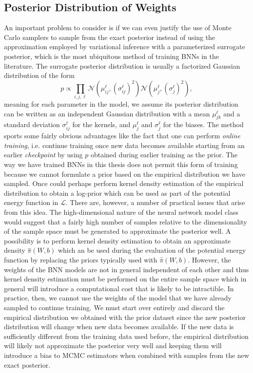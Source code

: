 \subsection{Posterior Distribution of Weights}
An important problem to consider is if we can even justify the use of Monte Carlo samplers to sample from the exact posterior instead of using the approximation employed by variational inference with a parameterized surrogate posterior, which is the most ubiquitous method of training BNNs in the literature. The surrogate posterior distribution is usually a factorized Gaussian distribution of the form
\begin{equation}\label{eq:surrogate_dist}
    p \propto \prod_{i, j, \ell} \mathcal{N}(\mu_{ij}^\ell, (\sigma_{ij}^\ell)^2) \mathcal{N}(\mu_{j}^\ell, (\sigma_{j}^\ell)^2),
\end{equation}
meaning for each parameter in the model, we assume its posterior distribution can be written as an independent Gaussian distribution with a mean $\mu_{jk}^\ell$ and a standard deviation $\sigma_{ij}^\ell$ for the kernels, and $\mu_j^\ell$ and $\sigma_j^\ell$ for the biases. The method sports some fairly obvious advantages like the fact that one can perform \textit{online training}, i.e. continue training once new data becomes available starting from an earlier \textit{checkpoint} by using $p$ obtained during earlier training as the prior. The way we have trained BNNs in this thesis does not permit this form of training because we cannot formulate a prior based on the empirical distribution we have sampled. Once could perhaps perform kernel density estimation of the empirical distribution to obtain a log-prior which can be used as part of the potential energy function in $\mathcal{L}$. There are, however, a number of practical issues that arise from this idea. The high-dimensional nature of the neural network model class would suggest that a fairly high number of samples relative to the dimensionality of the sample space must be generated to approximate the posterior well. A possibility is to perform kernel density estimation to obtain an approximate density $\hat{\pi}(W, b)$ which an be used during the evaluation of the potential energy function by replacing the priors typically used with $\hat{\pi}(W, b)$. However, the weights of the BNN models are not in general independent of each other and thus kernel density estimation must be performed on the entire sample space which in general will introduce a computational cost that is likely to be intractible.
In practice, then, we cannot use the weights of the model that we have already sampled to continue training. We must start over entirely and discard the empirical distribution we obtained with the prior dataset since the new posterior distribution will change when new data becomes available. If the new data is sufficiently different from the training data used before, the empirical distribution will likely not approximate the posterior very well and keeping them will introduce a bias to MCMC estimators when combined with samples from the new exact posterior.

